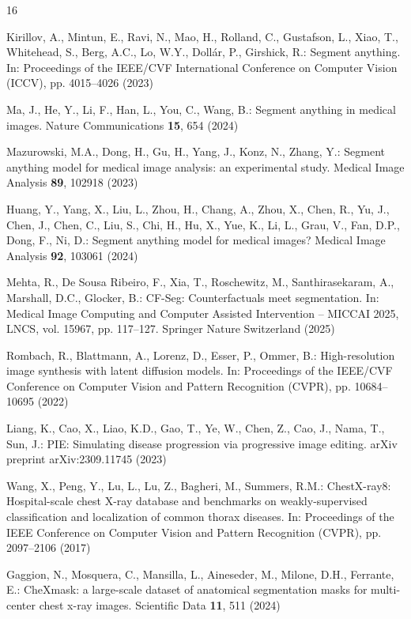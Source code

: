 \documentclass[runningheads]{llncs}
\begin{document}
\begin{thebibliography}{16}

Kirillov, A., Mintun, E., Ravi, N., Mao, H., Rolland, C., Gustafson, L., Xiao, T., Whitehead, S., Berg, A.C., Lo, W.Y., Doll{\'a}r, P., Girshick, R.: Segment anything. In: Proceedings of the IEEE/CVF International Conference on Computer Vision (ICCV), pp. 4015--4026 (2023)

Ma, J., He, Y., Li, F., Han, L., You, C., Wang, B.: Segment anything in medical images. Nature Communications \textbf{15}, 654 (2024)

Mazurowski, M.A., Dong, H., Gu, H., Yang, J., Konz, N., Zhang, Y.: Segment anything model for medical image analysis: an experimental study. Medical Image Analysis \textbf{89}, 102918 (2023)

Huang, Y., Yang, X., Liu, L., Zhou, H., Chang, A., Zhou, X., Chen, R., Yu, J., Chen, J., Chen, C., Liu, S., Chi, H., Hu, X., Yue, K., Li, L., Grau, V., Fan, D.P., Dong, F., Ni, D.: Segment anything model for medical images? Medical Image Analysis \textbf{92}, 103061 (2024)

Mehta, R., De Sousa Ribeiro, F., Xia, T., Roschewitz, M., Santhirasekaram, A., Marshall, D.C., Glocker, B.: CF-Seg: Counterfactuals meet segmentation. In: Medical Image Computing and Computer Assisted Intervention -- MICCAI 2025, LNCS, vol. 15967, pp. 117--127. Springer Nature Switzerland (2025)

Rombach, R., Blattmann, A., Lorenz, D., Esser, P., Ommer, B.: High-resolution image synthesis with latent diffusion models. In: Proceedings of the IEEE/CVF Conference on Computer Vision and Pattern Recognition (CVPR), pp. 10684--10695 (2022)

Liang, K., Cao, X., Liao, K.D., Gao, T., Ye, W., Chen, Z., Cao, J., Nama, T., Sun, J.: PIE: Simulating disease progression via progressive image editing. arXiv preprint arXiv:2309.11745 (2023)

Wang, X., Peng, Y., Lu, L., Lu, Z., Bagheri, M., Summers, R.M.: ChestX-ray8: Hospital-scale chest X-ray database and benchmarks on weakly-supervised classification and localization of common thorax diseases. In: Proceedings of the IEEE Conference on Computer Vision and Pattern Recognition (CVPR), pp. 2097--2106 (2017)

Gaggion, N., Mosquera, C., Mansilla, L., Aineseder, M., Milone, D.H., Ferrante, E.: CheXmask: a large-scale dataset of anatomical segmentation masks for multi-center chest x-ray images. Scientific Data \textbf{11}, 511 (2024)


\end{thebibliography}
\end{document}
